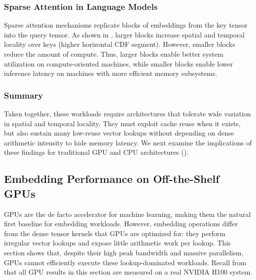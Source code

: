 \subsubsection{Sparse Attention in Language Models} \label{sec:embedding-characterization-llms} %

Sparse attention mechanisms replicate blocks of embeddings from the key tensor into the query tensor. As shown in , larger blocks increase spatial and temporal locality over keys (higher horizontal CDF segment). However, smaller blocks reduce the amount of compute. Thus, larger blocks enable better system utilization on compute-oriented machines, while smaller blocks enable lower inference latency on machines with more efficient memory subsystems.

\subsubsection{Summary} \label{sec:embedding-characterization-summary} %

Taken together, these workloads require architectures that tolerate wide variation in spatial and temporal locality. They must exploit cache reuse when it exists, but also sustain many low-reuse vector lookups without depending on dense arithmetic intensity to hide memory latency. We next examine the implications of these findings for traditional GPU and CPU architectures ().

\subsection{Embedding Performance on Off-the-Shelf GPUs} \label{sec:embedding-performance-gpus} %

GPUs are the de facto accelerator for machine learning, making them the natural first baseline for embedding workloads. However, embedding operations differ from the dense tensor kernels that GPUs are optimized for: they perform irregular vector lookups and expose little arithmetic work per lookup. This section shows that, despite their high peak bandwidth and massive parallelism, GPUs cannot efficiently execute these lookup-dominated workloads. Recall from  that all GPU results in this section are measured on a real NVIDIA H100 system.

